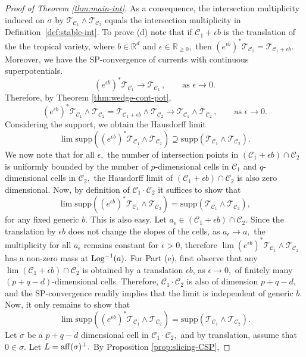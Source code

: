 \documentclass[11pt]{amsart}
\def\Log{{\rm Log}}
\def\aff{{\rm aff}}
\theoremstyle{definition}
\newcommand{\R}{\mathbb{R}}
\newcommand{\lto}{\longrightarrow}
\newcommand{\cC}{\mathcal{C}}
\newcommand{\sT}{\mathscr{T}}
\newcommand{\supp}[1]{{\mathrm{supp}(#1)}}
\begin{document}
\begin{proof}[Proof of Theorem \ref{thm:main-int}]
As a consequence, the intersection multiplicity induced on \(\sigma\) by \(\sT_{\cC_1} \wedge \sT_{\cC_2}\) equals the intersection multiplicity in Definition~\ref{def:stable-int}.
\vskip 2mm
To prove (d) note that if $\cC_1 + \epsilon b$ is the translation of the the tropical variety, where $ b\in \R^d$ and $\epsilon \in \R_{\geq 0},$ then $(e^{\epsilon b})^* \sT_{\cC_1}= \sT_{\cC_1 + \epsilon b}.$
Moreover, we have the SP-convergence of currents with continuous superpotentials. 
$$
(e^{\epsilon b})^* \sT_{\cC_1} \lto \sT_{\cC_1} \, ,\qquad \text{as $\epsilon \to 0.$}
$$
Therefore, by Theorem \ref{thm:wedge-cont-pot}, 
\begin{equation}\label{eq:current-perturb}
(e^{\epsilon b})^* \sT_{\cC_1} \wedge \sT_{\cC_2}= \sT_{\cC_1+ \epsilon b} \wedge \sT_{\cC_2}   \lto \sT_{\cC_1} \wedge \sT_{\cC_2}\, , \qquad \text{as $\epsilon \to 0.$} 
\end{equation}
Considering the support, we obtain the Hausdorff limit
$$
 \lim  \supp{(e^{\epsilon b})^* \sT_{\cC_1} \wedge \sT_{\cC_2}} \supseteq  \supp{\sT_{\cC_1} \wedge \sT_{\cC_2} } .
$$
We now note that for all $\epsilon,$ the number of intersection points in $(\cC_1+\epsilon b) \cap \cC_2$ is uniformly bounded by the number of $p$-dimensional cells in $\cC_1$ and $q$-dimensional cells in $\cC_2,$ the Hausdorff limit of $(\cC_1 + \epsilon b) \cap \cC_2$ is also zero dimensional. Now, by definition of $\cC_1 \cdot \cC_2$ it suffices to show that 
$$
 \lim  \supp{(e^{\epsilon b})^* \sT_{\cC_1} \wedge \sT_{\cC_2}} = \supp{\sT_{\cC_1} \wedge \sT_{\cC_2} },
$$
for any fixed generic $b$. This is also easy. Let $a_{\epsilon} \in (\cC_1 + \epsilon b) \cap  \cC_2.$ Since the translation by $\epsilon b$ does not change the slopes of the cells, as
$a_{\epsilon} \to a,$  the multiplicity for all $a_{\epsilon}$ remains constant for $\epsilon >0$, therefore $ \lim (e^{\epsilon b})^* \sT_{\cC_1} \wedge \sT_{\cC_2}$ has a non-zero mass at $\Log^{-1}(a).$
\vskip 2mm 
For Part (e), first observe that any $\lim (\cC_1+ \epsilon b ) \cap \cC_2$ is obtained by a translation $\epsilon b$, as $\epsilon \to 0,$ of finitely many $(p+q-d)$-dimensional cells. Therefore, $\cC_1 \cdot \cC_2$ is also of dimension $p+q -d,$ and the SP-convergence readily implies that the limit is independent of generic $b.$ Now, it only remains to show that
$$
 \lim  \supp{(e^{\epsilon b})^* \sT_{\cC_1} \wedge \sT_{\cC_2}} = \supp{\sT_{\cC_1} \wedge \sT_{\cC_2} }.
$$
Let $\sigma$ be a $p+q-d$ dimensional cell in $\cC_1 \cdot \cC_2,$ and by translation, assume that $0\in \sigma.$ Let $L = \aff(\sigma)^{\perp}.$ By Proposition \ref{prop:slicing-CSP}, 

\end{proof}
\end{document}
